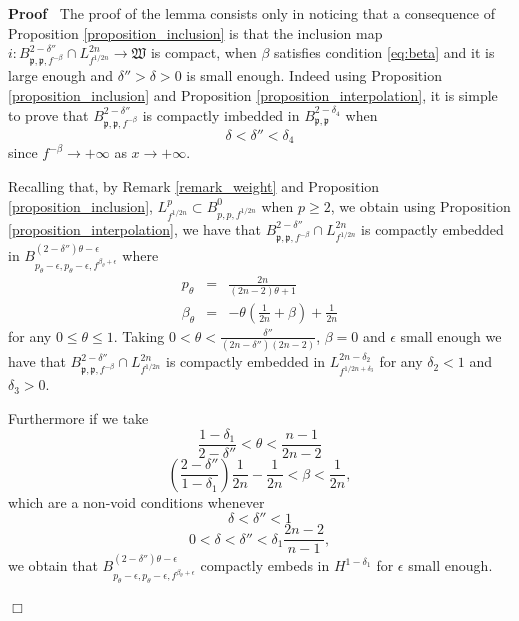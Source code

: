 \documentclass[a4paper,10pt]{article}
\newenvironment{proof}{\noindent\textbf{Proof\ }}{\hspace*{\fill}$\Box$\medskip}
\begin{document}
\begin{proof}
  The proof of the lemma consists only in noticing that a consequence of
  Proposition \ref{proposition_inclusion} is that the inclusion map $i : B^{2
  - \delta''}_{\mathfrak{p}, \mathfrak{p,} f^{- \beta}} \cap L^{2 n}_{f^{1 / 2
  n}} \rightarrow \mathfrak{W}$ is compact, when $\beta$ satisfies condition
  {\eqref{eq:beta}} and it is large enough and $\delta'' > \delta > 0$ is
  small enough. Indeed using Proposition \ref{proposition_inclusion} and
  Proposition \ref{proposition_interpolation}, it is simple to prove that
  $B^{2 - \delta''}_{\mathfrak{p}, \mathfrak{p,} f^{- \beta}}$ is compactly
  imbedded in $B^{2 - \delta_4}_{\mathfrak{p}, \mathfrak{p}}$ when
  \begin{equation}
    \delta < \delta'' < \delta_4 \label{eq:delta1}
  \end{equation}
  since $f^{- \beta} \rightarrow + \infty$ as $x \rightarrow + \infty$.
  
  Recalling that, by Remark \ref{remark_weight} and Proposition
  \ref{proposition_inclusion}, $L^p_{f^{1 / 2 n}} \subset B^0_{p, p, f^{1 / 2
  n}}$ when $p \geqslant 2$, we obtain using Proposition
  \ref{proposition_interpolation}, we have that $B^{2 -
  \delta''}_{\mathfrak{p}, \mathfrak{p,} f^{- \beta}} \cap L^{2 n}_{f^{1 / 2
  n}}$ is compactly embedded in $B^{(2 - \delta'') \theta -
  \epsilon}_{p_{\theta} - \epsilon, p_{\theta} - \epsilon, f^{\beta_{\theta} +
  \epsilon}}$ where
  \begin{eqnarray}
    p_{\theta} & = & \frac{2 n}{(2 n - 2) \theta + 1} \nonumber\\
    \beta_{\theta} & = & - \theta \left( \frac{1}{2 n} + \beta \right) +
    \frac{1}{2 n} \nonumber
  \end{eqnarray}
  for any $0 \leqslant \theta \leqslant 1$. Taking $0 < \theta <
  \frac{\delta''}{(2 n - \delta'') (2 n - 2)}$, $\beta = 0$ and $\epsilon$
  small enough we have that $B^{2 - \delta''}_{\mathfrak{p}, \mathfrak{p,}
  f^{- \beta}} \cap L^{2 n}_{f^{1 / 2 n}}$ is compactly embedded in $L^{2 n -
  \delta_2}_{f^{1 / 2 n + \delta_3}}$ for any $\delta_2 < 1$ and $\delta_3 >
  0$.
  
  Furthermore if we take
  \[ \frac{1 - \delta_1}{2 - \delta''} < \theta < \frac{n - 1}{2 n - 2} \]
  \[ \left( \frac{2 - \delta''}{1 - \delta_1} \right) \frac{1}{2 n} -
     \frac{1}{2 n} < \beta < \frac{1}{2 n}, \]
  which are a non-void conditions whenever
  \begin{equation}
    \delta < \delta'' < 1 \label{eq:delta2}
  \end{equation}
  \begin{equation}
    0 < \delta < \delta'' < \delta_1 \frac{2 n - 2}{n - 1} \label{eq:delta3},
  \end{equation}
  we obtain that $B^{(2 - \delta'') \theta - \epsilon}_{p_{\theta} - \epsilon,
  p_{\theta} - \epsilon, f^{\beta_{\theta} + \epsilon}}$ compactly embeds in
  $H^{1 - \delta_1}$ for $\epsilon$ small enough.
  

\end{proof}
\end{document}
